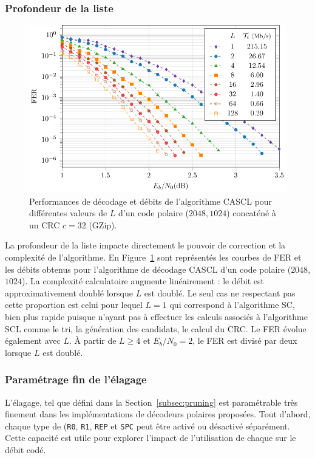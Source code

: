 \subsubsection{Profondeur de la liste}
\begin{figure}[t]
\includegraphics[width=\textwidth]{main/ch2_fig/curves/L/tikz/L}
\caption{Performances de décodage et débits de l'algorithme CASCL pour différentes valeurs de $L$ d'un code polaire ($2048,1024$) concaténé à un CRC $c=32$ (GZip).}
\label{fig:scl_l_thr}
\end{figure}
La profondeur de la liste impacte directement le pouvoir de correction et la complexité de l'algorithme. En Figure~\ref{fig:scl_l_thr} sont représentés les courbes de FER et les débits obtenus pour l'algorithme de décodage CASCL d'un code polaire ($2048$,$1024$). La complexité calculatoire augmente linéairement : le débit est approximativement doublé lorsque $L$ est doublé. Le seul cas ne respectant pas cette proportion est celui pour lequel $L=1$ qui correspond à l'algorithme SC, bien plus rapide puisque n'ayant pas à effectuer les calculs associés à l'algorithme SCL comme le tri, la génération des candidats, le calcul du CRC. Le FER évolue également avec $L$. \`A partir de $L\geq4$ et $E_b/N_0=2$, le FER est divisé par deux lorsque $L$ est doublé.

\subsubsection{Paramétrage fin de l'élagage}
L'élagage, tel que défini dans la Section~\ref{subsec:pruning} est paramétrable très finement dans les implémentations de décodeurs polaires proposées. Tout d'abord, chaque type de \noeud (\texttt{R0}, \texttt{R1}, \texttt{REP} et \texttt{SPC} peut être activé ou désactivé séparément. Cette capacité est utile pour explorer l'impact de l'utilisation de chaque \noeud sur le débit codé.

